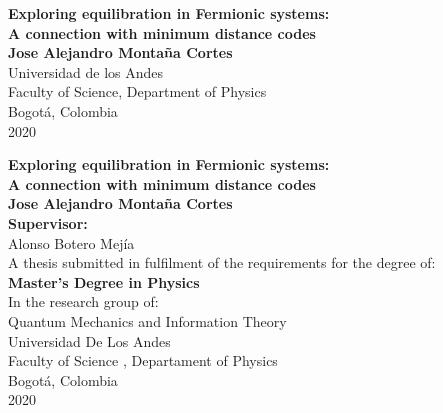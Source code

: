 \begin{center}
\begin{figure}
\centering%
%
\end{figure}
\thispagestyle{empty} \vspace*{0.0cm} \textbf{\huge
 Exploring equilibration in Fermionic systems: \\ A connection with minimum distance codes} \\[4.0cm]
\Large\textbf{Jose Alejandro Montaña Cortes}\\[5.5cm]
\small Universidad de los Andes\\
Faculty of Science, Department of Physics\\
Bogotá, Colombia\\
2020\\
\end{center}

\newpage{\pagestyle{empty}\cleardoublepage}

\newpage
\begin{center}
\thispagestyle{empty} \vspace*{0cm} \textbf{\huge Exploring equilibration in Fermionic systems: \\ A connection with minimum distance codes } \\[1.8cm]
\Large\textbf{Jose Alejandro Montaña Cortes}\\[2.5cm]
\textbf{Supervisor:}\\[1.0cm]
Alonso Botero Mejía\\[3.0cm]
\small A thesis submitted in fulfilment of the requirements for the degree of:\\
\textbf{Master's Degree in Physics}\\
In the research group of:\\
Quantum Mechanics and Information Theory\\[3.0cm]
Universidad De Los Andes\\
Faculty of Science , Departament of Physics\\
Bogotá, Colombia\\
2020\\



\end{center}


